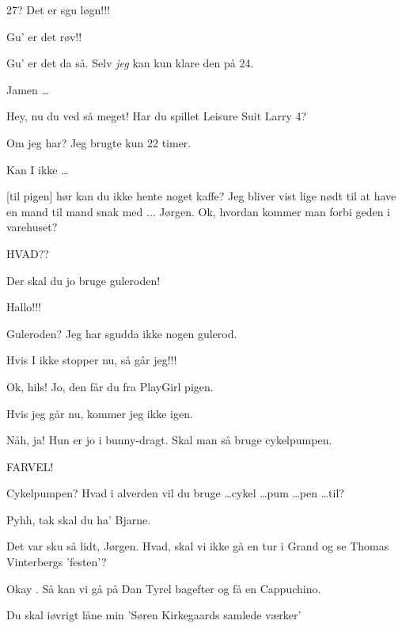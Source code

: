 \documentclass[danish]{article}
\begin{document}
\begin{sketch}
 27? Det er sgu løgn!!!

 Gu' er det røv!!

 Gu' er det da så. Selv \emph{jeg} kan kun klare den på 24.

 Jamen \ldots

 Hey, nu du ved så meget! Har du spillet Leisure Suit Larry 4?

 Om jeg har? Jeg brugte kun 22 timer.

 Kan I ikke \ldots

 [til pigen] hør kan du ikke hente noget kaffe? Jeg bliver vist
lige nødt til at have en mand til mand snak med 
... Jørgen.  Ok, hvordan kommer man forbi geden i
varehuset?

 HVAD??

 Der skal du jo bruge guleroden!

 Hallo!!!

 Guleroden? Jeg har sgudda ikke nogen gulerod.

 Hvis I ikke stopper nu, så går jeg!!!

 Ok, hils! Jo, den får du fra PlayGirl pigen.

 Hvis jeg går nu, kommer jeg ikke igen.

 Nåh, ja! Hun er jo i bunny-dragt. Skal man så bruge
cykelpumpen.

 FARVEL! 

 Cykelpumpen? Hvad i alverden vil du  bruge \ldots cykel \ldots pum \ldots pen
  \ldots til?


 Pyhh, tak skal du ha' Bjarne.

 Det var sku så lidt, Jørgen. Hvad, skal vi ikke gå en tur i
Grand og se Thomas Vinterbergs 'festen'?

 Okay . Så kan vi gå på Dan
Tyrel bagefter og få en Cappuchino.

 Du skal iøvrigt låne min 'Søren Kirkegaards samlede værker'


\end{sketch}
\end{document}
